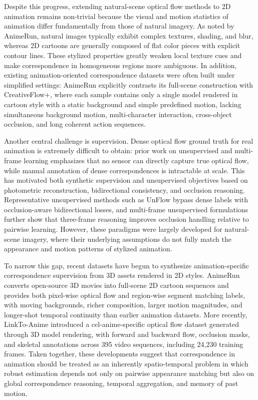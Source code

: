 Despite this progress, extending natural-scene optical flow methods to 2D animation remains non-trivial because the visual and motion statistics of animation differ fundamentally from those of natural imagery. As noted by AnimeRun, natural images typically exhibit complex textures, shading, and blur, whereas 2D cartoons are generally composed of flat color pieces with explicit contour lines. These stylized properties greatly weaken local texture cues and make correspondence in homogeneous regions more ambiguous. In addition, existing animation-oriented correspondence datasets were often built under simplified settings: AnimeRun explicitly contrasts its full-scene construction with CreativeFlow+, where each sample contains only a single model rendered in cartoon style with a static background and simple predefined motion, lacking simultaneous background motion, multi-character interaction, cross-object occlusion, and long coherent action sequences.

Another central challenge is supervision. Dense optical flow ground truth for real animation is extremely difficult to obtain: prior work on unsupervised and multi-frame learning emphasizes that no sensor can directly capture true optical flow, while manual annotation of dense correspondences is intractable at scale. This has motivated both synthetic supervision and unsupervised objectives based on photometric reconstruction, bidirectional consistency, and occlusion reasoning. Representative unsupervised methods such as UnFlow bypass dense labels with occlusion-aware bidirectional losses, and multi-frame unsupervised formulations further show that three-frame reasoning improves occlusion handling relative to pairwise learning. However, these paradigms were largely developed for natural-scene imagery, where their underlying assumptions do not fully match the appearance and motion patterns of stylized animation.

To narrow this gap, recent datasets have begun to synthesize animation-specific correspondence supervision from 3D assets rendered in 2D styles. AnimeRun converts open-source 3D movies into full-scene 2D cartoon sequences and provides both pixel-wise optical flow and region-wise segment matching labels, with moving backgrounds, richer composition, larger motion magnitudes, and longer-shot temporal continuity than earlier animation datasets. More recently, LinkTo-Anime introduced a cel-anime-specific optical flow dataset generated through 3D model rendering, with forward and backward flow, occlusion masks, and skeletal annotations across 395 video sequences, including 24,230 training frames. Taken together, these developments suggest that correspondence in animation should be treated as an inherently spatio-temporal problem in which robust estimation depends not only on pairwise appearance matching but also on global correspondence reasoning, temporal aggregation, and memory of past motion.

